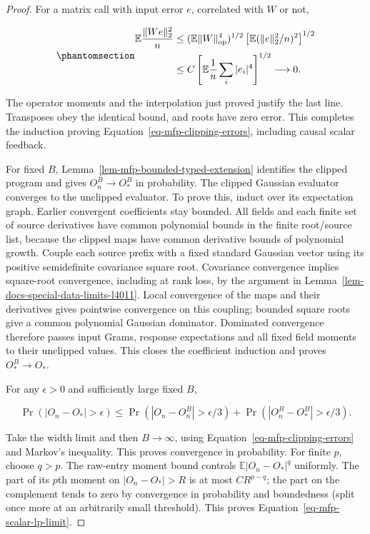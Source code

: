 \documentclass[
  11pt,
]{article}
\theoremstyle{definition}
\theoremstyle{plain}
\theoremstyle{plain}
\theoremstyle{plain}
\theoremstyle{remark}
\begin{document}
\begin{proof}
For a matrix call with input error \(e\), correlated with \(W\) or not,

\begin{equation}\protect\phantomsection\label{eq-mfp-correlated-matrix-error}{
\begin{aligned}
\mathbb E\frac{\|We\|_2^2}{n}
&\le (\mathbb E\|W\|_{\mathrm{op}}^4)^{1/2}
 \left[\mathbb E(\|e\|_2^2/n)^2\right]^{1/2}\\
&\le C\left[\mathbb E\frac1n\sum_i|e_i|^4\right]^{1/2}
\longrightarrow0.
\end{aligned}
}\end{equation}

The operator moments and the interpolation just proved justify the last
line. Transposes obey the identical bound, and roots have zero error.
This completes the induction proving
Equation~\ref{eq-mfp-clipping-errors}, including causal scalar feedback.

For fixed \(B\), Lemma~\ref{lem-mfp-bounded-typed-extension} identifies
the clipped program and gives \(O_n^B\to O_*^B\) in probability. The
clipped Gaussian evaluator converges to the unclipped evaluator. To
prove this, induct over its expectation graph. Earlier convergent
coefficients stay bounded. All fields and each finite set of source
derivatives have common polynomial bounds in the finite root/source
list, because the clipped maps have common derivative bounds of
polynomial growth. Couple each source prefix with a fixed standard
Gaussian vector using its positive semidefinite covariance square root.
Covariance convergence implies square-root convergence, including at
rank loss, by the argument in
Lemma~\ref{lem-docs-special-data-limits-l4011}. Local convergence of the
maps and their derivatives gives pointwise convergence on this coupling;
bounded square roots give a common polynomial Gaussian dominator.
Dominated convergence therefore passes input Grams, response
expectations and all fixed field moments to their unclipped values. This
closes the coefficient induction and proves \(O_*^B\to O_*\).

For any \(\epsilon>0\) and sufficiently large fixed \(B\),

\[
\Pr(|O_n-O_*|>\epsilon)
\le\Pr(|O_n-O_n^B|>\epsilon/3)
   +\Pr(|O_n^B-O_*^B|>\epsilon/3).
\]

Take the width limit and then \(B\to\infty\), using
Equation~\ref{eq-mfp-clipping-errors} and Markov's inequality. This
proves convergence in probability. For finite \(p\), choose \(q>p\). The
raw-entry moment bound controls \(\mathbb E|O_n-O_*|^q\) uniformly. The
part of its \(p\)th moment on \(|O_n-O_*|>R\) is at most \(CR^{p-q}\);
the part on the complement tends to zero by convergence in probability
and boundedness (split once more at an arbitrarily small threshold).
This proves Equation~\ref{eq-mfp-scalar-lp-limit}.


\end{proof}
\end{document}
